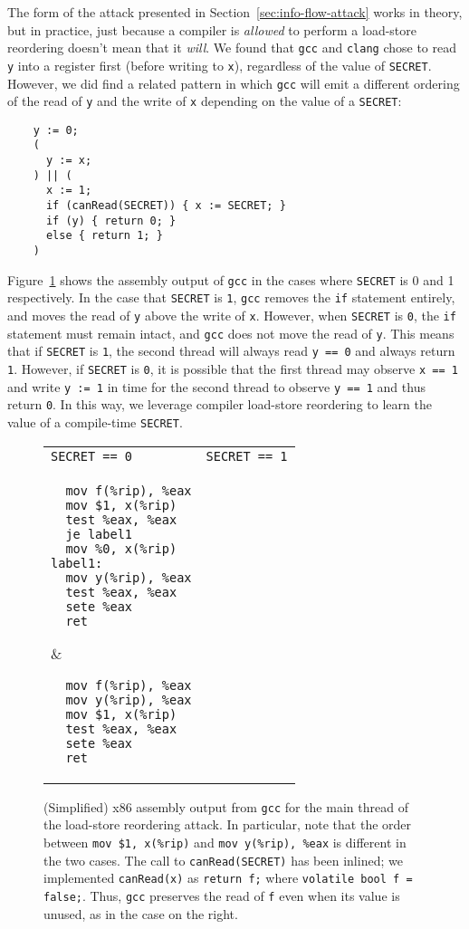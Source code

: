 The form of the attack presented in Section~\ref{sec:info-flow-attack} works in
theory, but in practice, just because a compiler is \emph{allowed} to perform a
load-store reordering doesn't mean that it \emph{will}.
We found that \verb|gcc| and \verb|clang| chose to read \verb|y| into a
register first (before writing to \verb|x|), regardless of the value of
\verb|SECRET|.
However, we did find a related pattern in which \verb|gcc| will emit a
different ordering of the read of \verb|y| and the write of \verb|x| depending
on the value of a \verb|SECRET|:
\begin{verbatim}
    y := 0;
    (
      y := x;
    ) || (
      x := 1;
      if (canRead(SECRET)) { x := SECRET; }
      if (y) { return 0; }
      else { return 1; }
    )
\end{verbatim}
Figure~\ref{fig:lsr-asm} shows the assembly output of \verb|gcc| in the cases
where \verb|SECRET| is 0 and 1 respectively.
In the case that \verb|SECRET| is \verb|1|, \verb|gcc| removes the \verb|if|
statement entirely, and moves the read of \verb|y| above the write of \verb|x|.
However, when \verb|SECRET| is \verb|0|, the \verb|if| statement must remain
intact, and \verb|gcc| does not move the read of \verb|y|.
This means that if \verb|SECRET| is \verb|1|, the second thread will always
read \verb|y == 0| and always return \verb|1|.
However, if \verb|SECRET| is \verb|0|, it is possible that the first thread
may observe \verb|x == 1| and write \verb|y := 1| in time for the second thread
to observe \verb|y == 1| and thus return \verb|0|.
In this way, we leverage compiler load-store reordering to learn the value of
a compile-time \verb|SECRET|.

\begin{figure}
  \begin{tabular}[fragile]{p{3cm} | p{3cm}}
    \texttt{SECRET == 0} & \texttt{SECRET == 1} \\
\begin{verbatim}
  mov f(%rip), %eax
  mov $1, x(%rip)
  test %eax, %eax
  je label1
  mov %0, x(%rip)
label1:
  mov y(%rip), %eax
  test %eax, %eax
  sete %eax
  ret
\end{verbatim}
  &
\begin{verbatim}
  mov f(%rip), %eax
  mov y(%rip), %eax
  mov $1, x(%rip)
  test %eax, %eax
  sete %eax
  ret
\end{verbatim}
  \\
  \end{tabular}
  \caption{
    (Simplified) x86 assembly output from \texttt{gcc} for the main thread of
    the load-store reordering attack.
    In particular, note that the order between \texttt{mov \$1, x(\%rip)}
    and \texttt{mov y(\%rip), \%eax} is different in the two cases.
    The call to \texttt{canRead(SECRET)} has been inlined; we implemented
    \texttt{canRead(x)} as \texttt{return f;} where
    \texttt{volatile bool f = false;}.
    Thus, \texttt{gcc} preserves the read of \texttt{f} even when its value is
    unused, as in the case on the right.
  }
  \label{fig:lsr-asm}
\end{figure}

